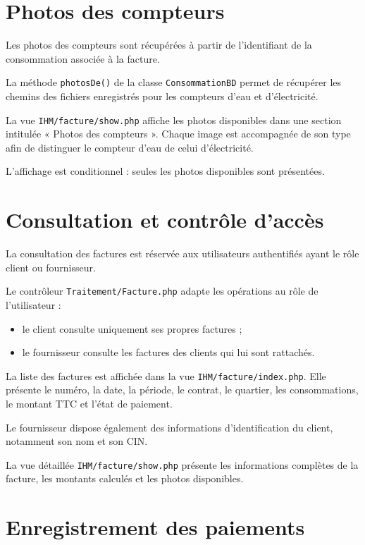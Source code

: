 \section{Photos des compteurs}

Les photos des compteurs sont récupérées à partir de l'identifiant de la consommation associée à la facture.

La méthode \texttt{photosDe()} de la classe \texttt{ConsommationBD} permet de récupérer les chemins des fichiers enregistrés pour les compteurs d'eau et d'électricité.

La vue \texttt{IHM/facture/show.php} affiche les photos disponibles dans une section intitulée « Photos des compteurs ». Chaque image est accompagnée de son type afin de distinguer le compteur d'eau de celui d'électricité.

L'affichage est conditionnel : seules les photos disponibles sont présentées.

\section{Consultation et contrôle d'accès}

La consultation des factures est réservée aux utilisateurs authentifiés ayant le rôle client ou fournisseur.

Le contrôleur \texttt{Traitement/Facture.php} adapte les opérations au rôle de l'utilisateur :
\begin{itemize}
    \item le client consulte uniquement ses propres factures ;
    \item le fournisseur consulte les factures des clients qui lui sont rattachés.
\end{itemize}

La liste des factures est affichée dans la vue \texttt{IHM/facture/index.php}. Elle présente le numéro, la date, la période, le contrat, le quartier, les consommations, le montant TTC et l'état de paiement.

Le fournisseur dispose également des informations d'identification du client, notamment son nom et son CIN.

La vue détaillée \texttt{IHM/facture/show.php} présente les informations complètes de la facture, les montants calculés et les photos disponibles.

\section{Enregistrement des paiements}

